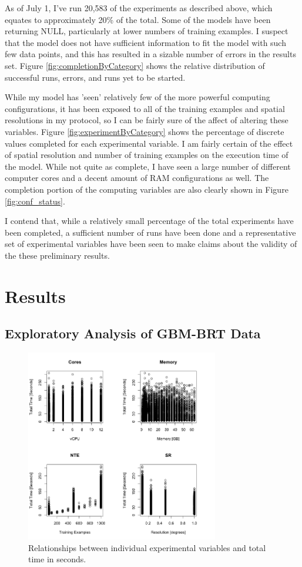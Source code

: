 \documentclass[a4paper]{article}
\begin{document}
As of July 1, I've run 20,583 of the experiments as described above, which equates to approximately 20\% of the total.  Some of the models have been returning NULL, particularly at lower numbers of training examples.  I suspect that the model does not have sufficient information to fit the model with such few data points, and this has resulted in a sizable number of errors in the results set.  Figure \ref{fig:completionByCategory} shows the relative distribution of successful runs, errors, and runs yet to be started.  

While my model has 'seen' relatively few of the more powerful computing configurations, it has been exposed to all of the training examples and spatial resolutions in my protocol, so I can be fairly sure of the affect of altering these variables. Figure \ref{fig:experimentByCategory} shows the percentage of discrete values completed for each experimental variable.  I am fairly certain of the effect of spatial resolution and number of training examples on the execution time of the model.  While not quite as complete, I have seen a large number of different computer cores and a decent amount of RAM configurations as well.  The completion portion of the computing variables are also clearly shown in Figure \ref{fig:conf_status}.

I contend that, while a relatively small percentage of the total experiments have been completed, a sufficient number of runs have been done and a representative set of experimental variables have been seen to make claims about the validity of the these preliminary results.

\section{Results}
\subsection{Exploratory Analysis of GBM-BRT Data}

\begin{figure}
\centering
\includegraphics[width=0.75\textwidth]{all_vars.png}
\caption{Relationships between individual experimental variables and total time in seconds.} \label{fig:all_vars}
\end{figure}
\end{document}

